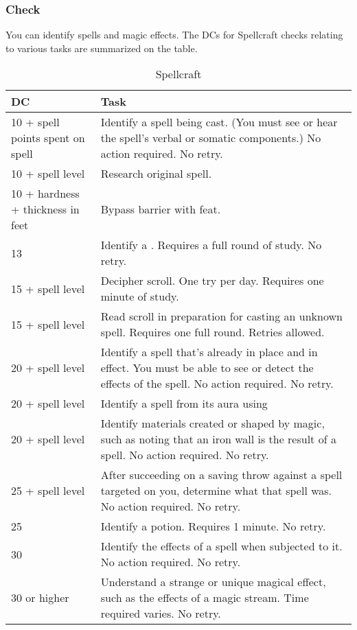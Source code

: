 \subsubsection{Check}
You can identify spells and magic effects. The DCs for Spellcraft checks relating to various tasks are summarized on the  table.
\begin{table*}
\centering
\caption{Spellcraft}
\label{tab:Spellcraft}
\begin{tabular}{|p{}|p{}|}
\hline
\textbf{DC}&\textbf{Task}\\
\hline
10 + spell points spent on spell&Identify a spell being cast. (You must see or hear the spell's verbal or somatic components.) No action required. No retry.\\
10 + spell level&Research original spell.\\
10 + hardness + thickness in feet&Bypass barrier with \nameref{Feat:BurrowingSpell} feat.\\
13 &Identify a \nameref{Spell:GlyphOfWarding}. Requires a full round of study. No retry.\\
15 + spell level&Decipher scroll. One try per day. Requires one minute of study.\\
15 + spell level&Read scroll in preparation for casting an unknown spell. Requires one full round. Retries allowed.\\
20 + spell level&Identify a spell that's already in place and in effect. You must be able to see or detect the effects of the spell. No action required. No retry.\\
20 + spell level&Identify a spell from its aura using \nameref{Spell:DetectMagic}\\
20 + spell level&Identify materials created or shaped by magic, such as noting that an iron wall is the result of a \nameref{Spell:WallOfIron} spell. No action required. No retry.\\
25 + spell level&After succeeding on a saving throw against a spell targeted on you, determine what that spell was. No action required. No retry.\\
25 &Identify a potion. Requires 1 minute. No retry.\\
30 &Identify the effects of a \nameref{Spell:PlanarBinding} spell when subjected to it. No action required. No retry.\\
30 or higher&Understand a strange or unique magical effect, such as the effects of a magic stream. Time required varies. No retry.\\
\hline
\end{tabular}
\normalsize
\end{table*}
